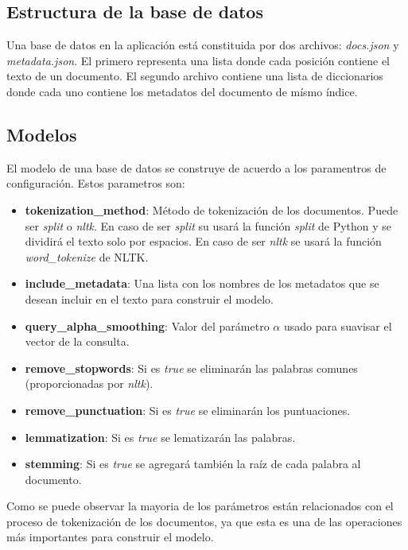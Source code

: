 \subsection{Estructura de la base de datos}\label{sec:build-database}

Una base de datos en la aplicación está constituida por dos archivos:
\emph{docs.json} y \emph{metadata.json}. El primero representa
una lista donde cada posición contiene el texto de un documento. El
segundo archivo contiene una lista de diccionarios donde cada uno
contiene los metadatos del documento de mísmo índice.

\subsection{Modelos}\label{sec:model}

El modelo de una base de datos se construye de acuerdo a los paramentros de
configuración. Estos parametros son:

\begin{itemize}
	\item \textbf{tokenization\_method}: Método de tokenización de los
		documentos. Puede ser \emph{split} o \emph{nltk}. En caso de ser
		\emph{split} su usará la función \emph{split} de Python y se
		dividirá el texto solo por espacios. En caso de ser \emph{nltk} se
		usará la función \emph{word\_tokenize} de NLTK.
	\item \textbf{include\_metadata}: Una lista con los nombres de los
		metadatos que se desean incluir en el texto para construir el modelo.
	\item \textbf{query\_alpha\_smoothing}: Valor del parámetro $\alpha$ usado
		para suavisar el vector de la consulta.
	\item \textbf{remove\_stopwords}: Si es \emph{true} se eliminarán las
		palabras comunes (proporcionadas por \emph{nltk}).
	\item \textbf{remove\_punctuation}: Si es \emph{true} se eliminarán los
		puntuaciones.
	\item \textbf{lemmatization}: Si es \emph{true} se lematizarán las
		palabras.
	\item \textbf{stemming}: Si es \emph{true} se agregará también la raíz de
		cada palabra al documento.
\end{itemize}

Como se puede observar la mayoria de los parámetros están relacionados
con el proceso de tokenización de los documentos, ya que esta es una de las
operaciones más importantes para construir el modelo.

